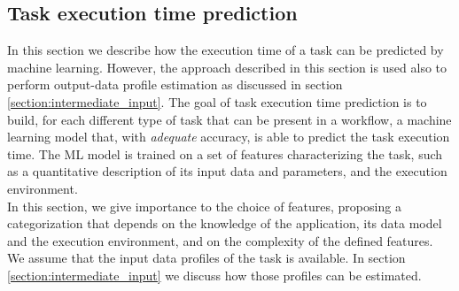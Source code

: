 \documentclass[a4paper, 10pt, conference]{ieeeconf}      %
\begin{document}









\subsection{Task execution time prediction}
\label{section:task_modeling}
In this section we describe how the execution time of a task can be predicted by machine learning. However, the approach described in this section is used also to perform output-data profile estimation as discussed in section \ref{section:intermediate_input}. 
The goal of task execution time  prediction is to build, for each different type of task that can be present in a workflow, a machine learning model that, with \textit{adequate} accuracy, is able to predict the task execution time.
The ML model is trained on a set of features characterizing the task, such as a quantitative description of its input data and parameters, and the execution environment. \\
In this section, we give importance to the choice  of features, proposing a categorization that depends on the knowledge of the application, its data model and the execution environment, and on the complexity of the defined features.
\noindent We assume that the input data profiles of the task is available. In section \ref{section:intermediate_input} we discuss how those profiles can be estimated.  \\  
\end{document}
